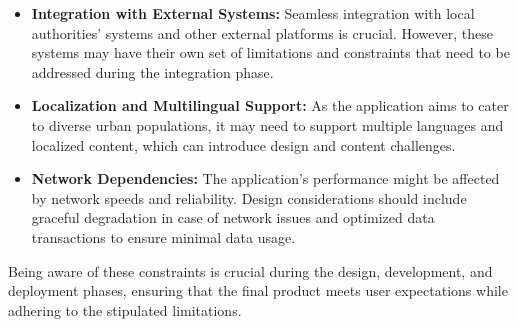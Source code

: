 \begin{itemize}
    \item \textbf{Integration with External Systems:} Seamless integration with local authorities' systems and other external platforms is crucial. However, these systems may have their own set of limitations and constraints that need to be addressed during the integration phase.
    
    \item \textbf{Localization and Multilingual Support:} As the application aims to cater to diverse urban populations, it may need to support multiple languages and localized content, which can introduce design and content challenges.
    
    \item \textbf{Network Dependencies:} The application's performance might be affected by network speeds and reliability. Design considerations should include graceful degradation in case of network issues and optimized data transactions to ensure minimal data usage.
\end{itemize}

Being aware of these constraints is crucial during the design, development, and deployment phases, ensuring that the final product meets user expectations while adhering to the stipulated limitations.
